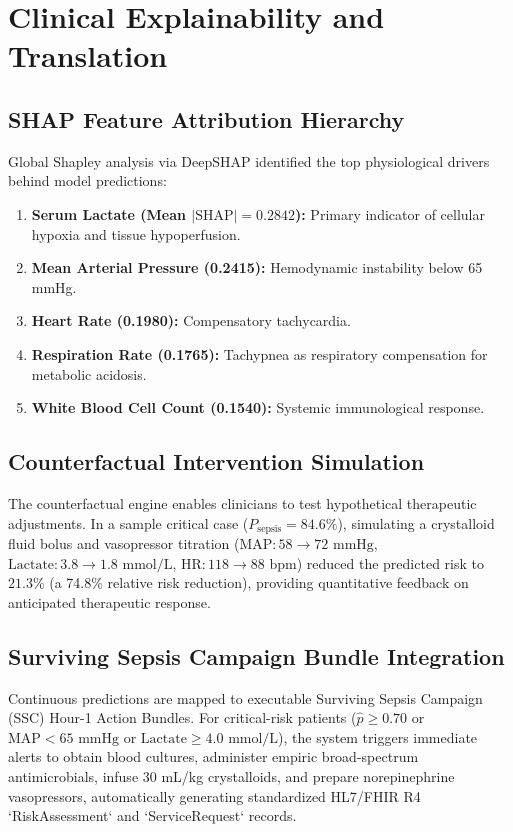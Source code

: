 \documentclass[conference]{IEEEtran}
\begin{document}
\section{Clinical Explainability and Translation}

\subsection{SHAP Feature Attribution Hierarchy}
Global Shapley analysis via DeepSHAP identified the top physiological drivers behind model predictions:
\begin{enumerate}
    \item \textbf{Serum Lactate (Mean $|\text{SHAP}| = 0.2842$):} Primary indicator of cellular hypoxia and tissue hypoperfusion.
    \item \textbf{Mean Arterial Pressure (0.2415):} Hemodynamic instability below 65 mmHg.
    \item \textbf{Heart Rate (0.1980):} Compensatory tachycardia.
    \item \textbf{Respiration Rate (0.1765):} Tachypnea as respiratory compensation for metabolic acidosis.
    \item \textbf{White Blood Cell Count (0.1540):} Systemic immunological response.
\end{enumerate}

\subsection{Counterfactual Intervention Simulation}
The counterfactual engine enables clinicians to test hypothetical therapeutic adjustments. In a sample critical case ($P_{\text{sepsis}} = 84.6\%$), simulating a crystalloid fluid bolus and vasopressor titration ($\text{MAP}: 58 \to 72\text{ mmHg}$, $\text{Lactate}: 3.8 \to 1.8\text{ mmol/L}$, $\text{HR}: 118 \to 88\text{ bpm}$) reduced the predicted risk to $21.3\%$ (a 74.8\% relative risk reduction), providing quantitative feedback on anticipated therapeutic response.

\subsection{Surviving Sepsis Campaign Bundle Integration}
Continuous predictions are mapped to executable Surviving Sepsis Campaign (SSC) Hour-1 Action Bundles. For critical-risk patients ($\hat{p} \ge 0.70$ or $\text{MAP} < 65\text{ mmHg}$ or $\text{Lactate} \ge 4.0\text{ mmol/L}$), the system triggers immediate alerts to obtain blood cultures, administer empiric broad-spectrum antimicrobials, infuse 30 mL/kg crystalloids, and prepare norepinephrine vasopressors, automatically generating standardized HL7/FHIR R4 `RiskAssessment` and `ServiceRequest` records.
\end{document}
